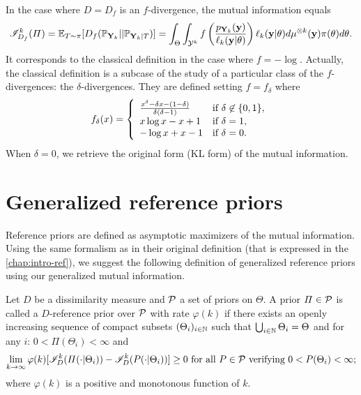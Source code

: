 In the case where $D=D_f$ is an $f$-divergence, the mutual information equals
    \begin{equation}
        \mathscr{I}_{D_f}^k(\varPi) =\mathbb{E}_{T\sim\pi}[D_f(\mathbb{P}_{\mathbf{Y}_k}||\mathbb{P}_{\mathbf{Y}_k|T})] = \int_\Theta\int_{\mathcal{Y}^k}f\left( \frac{p_{\mathbf{Y}_k}(\mathbf{y})}{\ell_k(\mathbf{y}|\theta)} \right) \ell_k(\mathbf{y}|\theta)d\mu^{\otimes k}(\mathbf{y}) \pi(\theta)d\theta.
    \end{equation}
It corresponds to  the classical definition in the case where $f=-\log$. Actually, the classical definition is a subcase of the study of a particular class of the $f$-divergences:  the $\delta$-divergences. They are defined setting $f=f_\delta$ where 
\begin{equation}
    f_\delta(x) = \left\lbrace\begin{array}{l l} \frac{x^\delta-\delta x-(1-\delta)}{\delta(\delta-1)} & \text{if\ }\delta\not\in\{0,1\},\\ 
        x\log x-x+1  & \text{if\ }\delta=1, \\
        -\log x +x -1 & \text{if\ }\delta=0.
    \end{array}\right. 
\end{equation}    
When $\delta=0$, we retrieve the original form (KL form) of the mutual information.


\section{Generalized reference priors}\label{sec:PSGSA:generefp}


Reference priors are defined as asymptotic maximizers of the mutual information. Using the same formalism as in their original definition (that is expressed in the \cref{chap:intro-ref}), we suggest the following definition of generalized reference priors using our generalized mutual information.

\begin{defi}\label{def:genref}
    Let $D$ be a dissimilarity measure and $\mathcal{P}$ a set of priors on $\Theta$. A prior $\varPi\in\mathcal{P}$ is called a $D$-reference prior over $\mathcal{P}$ with rate $\varphi(k)$ if there exists an openly increasing  sequence of compact subsets $(\Theta_i)_{i\in\mathbb{N}}$
    such that $\bigcup_{i\in\mathbb{N}}\Theta_i=\Theta$ and for any $i$: $0<\varPi(\Theta_i)<\infty $ and
        \begin{equation}\label{eq:defrefpriorsi}
            \lim_{k\rightarrow\infty}\varphi(k)[\sI^k_D(\varPi(\cdot|\Theta_i))-\sI^k_D(P(\cdot|\Theta_i))] \geq0 \text{\ for all\ } P\in\cP\text{\ verifying\ }0<P(\Theta_i)<\infty;
        \end{equation}
    where  $\varphi(k)$ is a {positive and}  monotonous function of $k$.
\end{defi}


